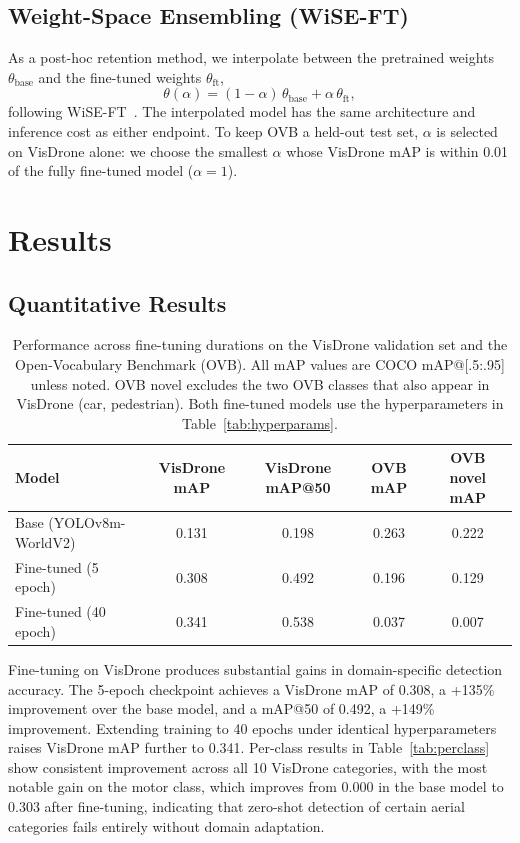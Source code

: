 \documentclass[conf]{new-aiaa}
\begin{document}
\subsection{Weight-Space Ensembling (WiSE-FT)}

As a post-hoc retention method, we interpolate between the pretrained weights
$\theta_{\text{base}}$ and the fine-tuned weights $\theta_{\text{ft}}$,
\begin{equation}
\theta(\alpha) = (1-\alpha)\,\theta_{\text{base}} + \alpha\,\theta_{\text{ft}},
\end{equation}
following WiSE-FT~\cite{wortsman2022robust}. The interpolated model has the same architecture
and inference cost as either endpoint. To keep OVB a held-out test set, $\alpha$ is selected on
VisDrone alone: we choose the smallest $\alpha$ whose VisDrone mAP is within 0.01 of the fully
fine-tuned model ($\alpha = 1$).


\section{Results}

\subsection{Quantitative Results}
\begin{table}[hbt!]
\caption{Performance across fine-tuning durations on the VisDrone validation set and the
         Open-Vocabulary Benchmark (OVB). All mAP values are COCO mAP@[.5:.95] unless noted.
         OVB novel excludes the two OVB classes that also appear in VisDrone (car,
         pedestrian). Both fine-tuned models use the hyperparameters in
         Table~\ref{tab:hyperparams}.}
\label{tab:results}
\centering
\begin{tabular}{lcccc}
\hline
\textbf{Model} & \textbf{VisDrone mAP} & \textbf{VisDrone mAP@50}
& \textbf{OVB mAP} & \textbf{OVB novel mAP} \\
\hline
Base (YOLOv8m-WorldV2) & 0.131 & 0.198 & 0.263 & 0.222 \\
Fine-tuned (5 epoch)   & 0.308 & 0.492 & 0.196 & 0.129 \\
Fine-tuned (40 epoch)  & 0.341 & 0.538 & 0.037 & 0.007 \\
\hline
\end{tabular}
\end{table}

Fine-tuning on VisDrone produces substantial gains in domain-specific detection accuracy.
The 5-epoch checkpoint achieves a VisDrone mAP of 0.308, a +135\% improvement over the base
model, and a mAP@50 of 0.492, a +149\% improvement. Extending training to 40 epochs under
identical hyperparameters raises VisDrone mAP further to 0.341. Per-class results in
Table~\ref{tab:perclass} show consistent improvement across all 10 VisDrone categories, with
the most notable gain on the motor class, which improves from 0.000 in the base model to 0.303
after fine-tuning, indicating that zero-shot detection of certain aerial categories fails
entirely without domain adaptation.
\end{document}
